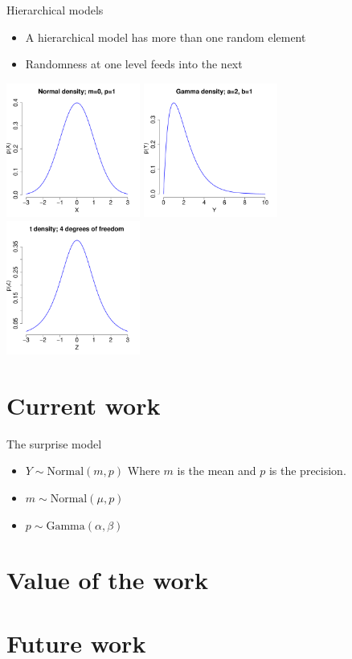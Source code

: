 \documentclass{beamer}
\begin{document}
\begin{frame}{Hierarchical models}
	\begin{itemize}
		\item A hierarchical model has more than one random element
		\item Randomness at one level feeds into the next
	\end{itemize}

	\begin{center}
		\includegraphics[width=0.33\textwidth]{../../figures/normal_pdf}
		\includegraphics[width=0.33\textwidth]{../../figures/gamma_pdf}
		\includegraphics[width=0.33\textwidth]{../../figures/t_pdf}
	\end{center}
\end{frame}


\section{Current work}

\begin{frame}{The surprise model}
	\begin{itemize}
		\item $Y \sim \text{Normal}(m, p)$ Where $m$ is the mean and $p$ is the precision.
		\item $m \sim \text{Normal}(\mu, p)$
		\item $p \sim \text{Gamma}(\alpha, \beta)$
	\end{itemize}
\end{frame}

\section{Value of the work}


\section{Future work}
\end{document}
